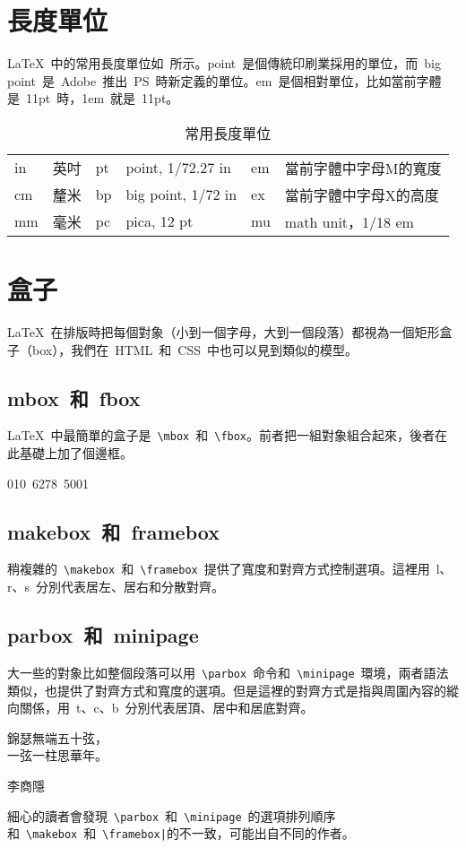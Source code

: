 \section{長度單位}
\LaTeX~中的常用長度單位如~所示。point~是個傳統印刷業採用的單位，而~big point~是~Adobe~推出~PS~時新定義的單位。em~是個相對單位，比如當前字體是~11pt~時，1em~就是~11pt。
\begin{table}[htbp]
\caption{常用長度單位}
\label{tab:unit}
\centering
\begin{tabular}{llllll}
    \toprule
    in & 英吋 & pt & point, 1/72.27 in  & em & 當前字體中字母M的寬度 \\
    cm & 釐米 & bp & big point, 1/72 in & ex & 當前字體中字母X的高度 \\
    mm & 毫米 & pc & pica, 12 pt        & mu & math unit，1/18 em \\
    \bottomrule
\end{tabular}
\end{table}

\section{盒子}
\LaTeX~在排版時把每個對象（小到一個字母，大到一個段落）都視為一個矩形盒子（box），我們在~HTML~和~CSS~中也可以見到類似的模型。

\subsection{mbox~和~fbox}

\LaTeX~中最簡單的盒子是~\verb|\mbox|~和~\verb|\fbox|。前者把一組對象組合起來，後者在此基礎上加了個邊框。
\begin{demo}
\mbox{010 6278 5001}
\end{demo}

\subsection{makebox~和~framebox}
稍複雜的~\verb|\makebox|~和~\verb|\framebox|~提供了寬度和對齊方式控制選項。這裡用~l、r、s~分別代表居左、居右和分散對齊。
\begin{demo}
\end{demo}

\subsection{parbox~和~minipage}
大一些的對象比如整個段落可以用~\verb|\parbox|~命令和~\verb|\minipage|~環境，兩者語法類似，也提供了對齊方式和寬度的選項。但是這裡的對齊方式是指與周圍內容的縱向關係，用~t、c、b~分別代表居頂、居中和居底對齊。

\begin{demo}
\parbox[c]{90pt}{錦瑟無端五十弦，\\一弦一柱思華年。}李商隱
\end{demo}

細心的讀者會發現~\verb|\parbox|~和~\verb|\minipage|~的選項排列順序和~\verb|\makebox|~和~\verb~\framebox|~的不一致，可能出自不同的作者。



\newpage


